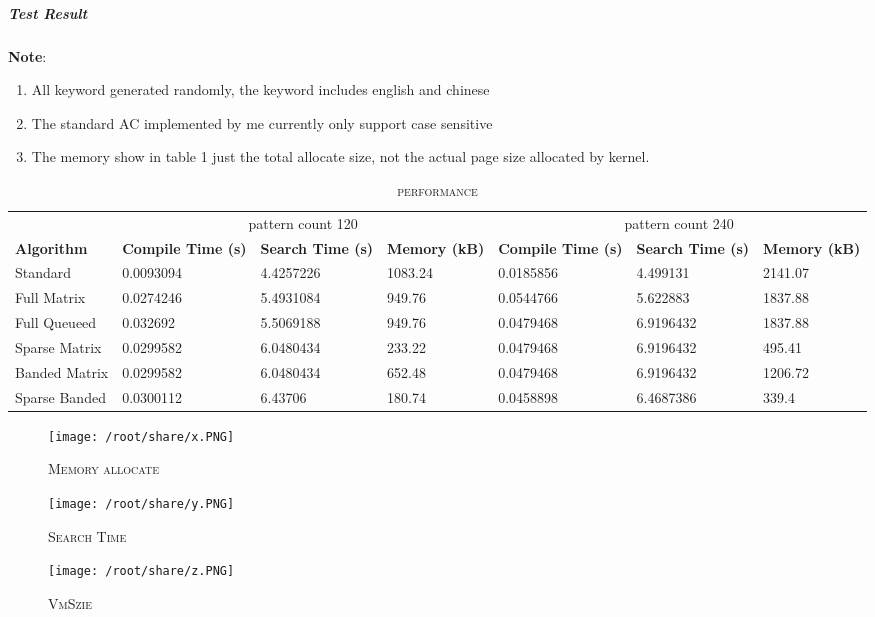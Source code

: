 \documentclass{article}
\begin{document}
\subparagraph{Test Result}

\textbf{Note}:
\begin{enumerate}
  \item All keyword generated randomly, the keyword includes english and chinese
  \item The standard AC implemented by me currently only support case sensitive
  \item The memory show in table 1 just the total allocate size, not the actual page size allocated by kernel.
\end{enumerate}


\begin{table}[h]
\caption{\textsc{performance}}
\begin{tabular}{ |l|p{2cm}|p{2cm}|p{2cm}|p{2cm}|p{2cm}|p{2cm}| }
\hline\hline
& \multicolumn{3}{|c|}{pattern count 120}  &
  \multicolumn{3}{|c|}{pattern count 240} \\
\cline{2-7}
\textbf{Algorithm} & \textbf{Compile Time (s)}  & \textbf{Search Time (s)} & \textbf{Memory (kB)} & \textbf{Compile Time (s)} & \textbf{Search Time (s)} & \textbf{Memory (kB)} \\
\hline\hline
Standard      & 0.0093094 & 4.4257226 & 1083.24 & 0.0185856 & 4.499131 & 2141.07\\
Full Matrix   & 0.0274246 & 5.4931084 & 949.76 & 0.0544766 & 5.622883 & 1837.88\\
Full Queueed  & 0.032692  & 5.5069188 & 949.76 & 0.0479468 & 6.9196432 & 1837.88\\
Sparse Matrix & 0.0299582 & 6.0480434 & 233.22 & 0.0479468 & 6.9196432 & 495.41\\
Banded Matrix & 0.0299582 & 6.0480434 & 652.48 & 0.0479468 & 6.9196432 & 1206.72\\
Sparse Banded & 0.0300112 & 6.43706 & 180.74 & 0.0458898 & 6.4687386 & 339.4\\
\hline
\end{tabular}
\end{table}

\begin{figure}[h]
\caption{\textsc{Memory allocate}}
\texttt{[image: /root/share/x.PNG]}
\end{figure}

\begin{figure}[h]
\caption{\textsc{Search Time}}
\texttt{[image: /root/share/y.PNG]}
\end{figure}

\begin{figure}[h]
\caption{\textsc{VmSzie}}
\texttt{[image: /root/share/z.PNG]}
\end{figure}
\end{document}
